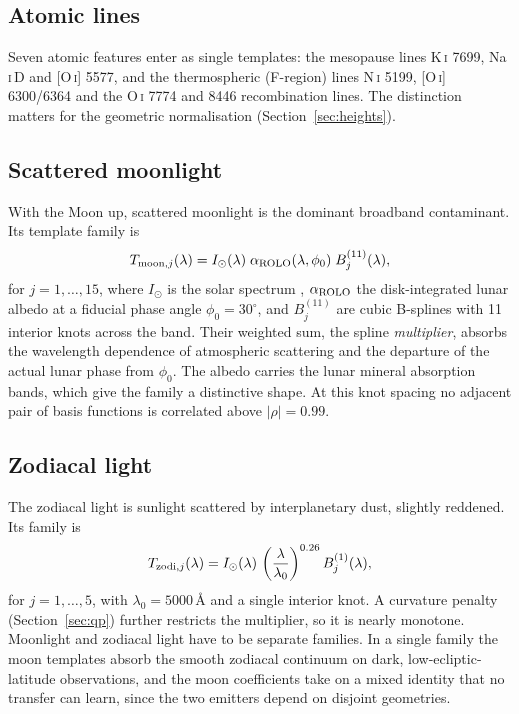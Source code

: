 \subsection{Atomic lines}

Seven atomic features enter as single templates: the mesopause lines
K\,\textsc{i} 7699, Na\,\textsc{i}\,D and [O\,\textsc{i}] 5577, and the
thermospheric (F-region) lines N\,\textsc{i} 5199, [O\,\textsc{i}]
6300/6364 and the O\,\textsc{i} 7774 and 8446 recombination lines. The
distinction matters for the geometric normalisation
(Section~\ref{sec:heights}).

\subsection{Scattered moonlight}
\label{sec:moonfam}

With the Moon up, scattered moonlight is the dominant broadband contaminant.
Its template family is
\begin{equation}
  T_{{\rm moon},j}(\lambda) = I_\odot(\lambda)\;
  \alpha_{\rm ROLO}(\lambda,\phi_0)\; B^{(11)}_j(\lambda),
\end{equation}
for $j = 1,\dots,15$, where $I_\odot$ is the solar spectrum
\citep{Meftah2018}, $\alpha_{\rm ROLO}$ the disk-integrated lunar albedo
\citep{Kieffer2005} at a fiducial phase angle $\phi_0 = 30^\circ$, and
$B^{(11)}_j$ are cubic B-splines with 11 interior knots across the band.
Their weighted sum, the spline \emph{multiplier}, absorbs the wavelength
dependence of atmospheric scattering and the departure of the actual lunar
phase from $\phi_0$. The albedo carries the lunar mineral absorption bands,
which give the family a distinctive shape. At this knot spacing no adjacent
pair of basis functions is correlated above $|\rho| = 0.99$.

\subsection{Zodiacal light}
\label{sec:zodifam}

The zodiacal light is sunlight scattered by interplanetary dust, slightly
reddened. Its family is
\begin{equation}
  T_{{\rm zodi},j}(\lambda) = I_\odot(\lambda)\,
  \left(\frac{\lambda}{\lambda_0}\right)^{0.26} B^{(1)}_j(\lambda),
\end{equation}
for $j = 1,\dots,5$, with $\lambda_0 = 5000$\,\AA{} and a single interior
knot. A curvature penalty (Section~\ref{sec:qp}) further restricts the
multiplier, so it is nearly monotone. Moonlight and zodiacal light have to be
separate families. In a single family the moon templates absorb the smooth
zodiacal continuum on dark, low-ecliptic-latitude observations, and the moon
coefficients take on a mixed identity that no transfer can learn, since the
two emitters depend on disjoint geometries.


